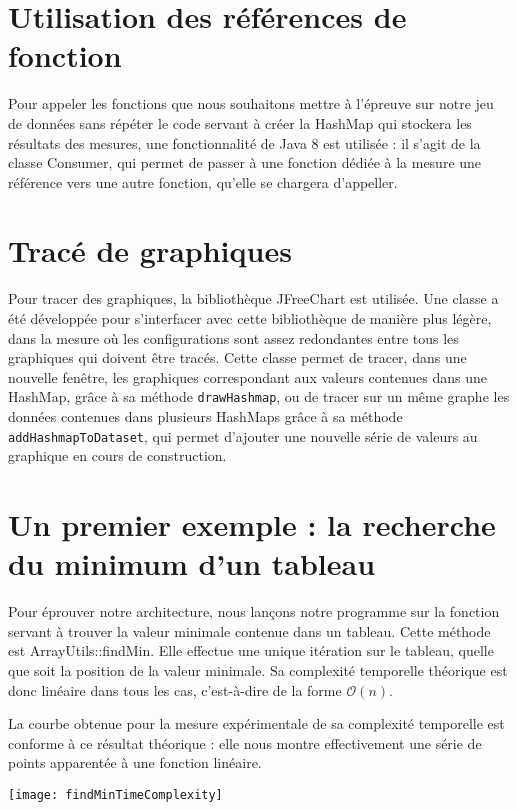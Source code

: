   \section{Utilisation des références de fonction}

    Pour appeler les fonctions que nous souhaitons mettre à l'épreuve sur notre jeu de données sans répéter le code
    servant à créer la HashMap qui stockera les résultats des mesures, une fonctionnalité de Java 8 est utilisée :
     il s'agit de la classe Consumer, qui permet de passer à une fonction dédiée à la mesure une référence
     vers une autre fonction, qu'elle se chargera d'appeller.

  \section{Tracé de graphiques}

    Pour tracer des graphiques, la bibliothèque JFreeChart est utilisée. Une classe a été développée pour s'interfacer
    avec cette bibliothèque de manière plus légère, dans la mesure où les configurations sont assez redondantes entre tous
    les graphiques qui doivent être tracés. Cette classe permet de tracer, dans une nouvelle fenêtre, les graphiques
    correspondant aux valeurs contenues dans une HashMap, grâce à sa méthode \texttt{drawHashmap}, ou de tracer sur
    un même graphe les données contenues dans plusieurs HashMaps grâce à sa méthode \texttt{addHashmapToDataset}, qui permet
     d'ajouter une nouvelle série de valeurs au graphique en cours de construction.


  \section{Un premier exemple : la recherche du minimum d'un tableau}

    Pour éprouver notre architecture, nous lançons notre programme sur la fonction servant à trouver la valeur
    minimale contenue dans un tableau. Cette méthode est ArrayUtils::findMin. Elle effectue une unique itération
    sur le tableau, quelle que soit la position de la valeur minimale. Sa complexité temporelle théorique
    est donc linéaire dans tous les cas, c'est-à-dire de la forme $\mathcal{O}(n)$.

    La courbe obtenue pour la mesure expérimentale de sa complexité temporelle est conforme à ce résultat théorique :
    elle nous montre effectivement une série de points apparentée à une fonction linéaire.

  \begin{center}
    \texttt{[image: findMinTimeComplexity]}
  \end{center}


